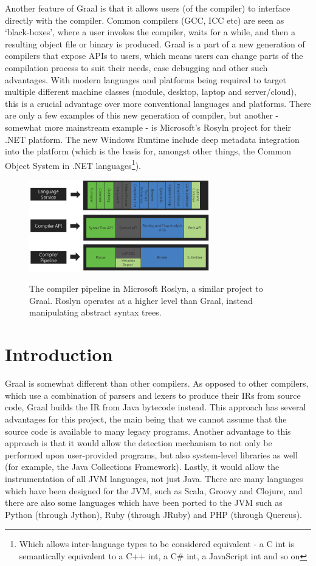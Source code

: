 Another feature of Graal is that it allows users (of the compiler) to interface directly with the compiler. Common compilers (GCC, ICC etc) are seen as `black-boxes', where a user invokes the compiler, waits for a while, and then a resulting object file or binary is produced. Graal is a part of a new generation of compilers that expose APIs to users, which means users can change parts of the compilation process to suit their needs, ease debugging and other such advantages. With modern languages and platforms being required to target multiple different machine classes (module, desktop, laptop and server/cloud), this is a crucial advantage over more conventional languages and platforms. There are only a few examples of this new generation of compiler, but another - somewhat more mainstream example - is Microsoft's Rosyln project \citep{RoslynProject} for their .NET platform. The new Windows Runtime include deep metadata integration into the platform (which is the basis for, amongst other things, the Common Object System in .NET languages\footnote{Which allows inter-language types to be considered equivalent - a C int is semantically equivalent to a C++ int, a C\# int, a JavaScript int and so on}).

\begin{figure}
	\centering
	\includegraphics[width=0.7\textwidth]{graphics/roslyn-pipeline.pdf}
	\label{fig:roslyn-pipeline}
	\caption{The compiler pipeline in Microsoft Roslyn, a similar project to Graal. Roslyn operates at a higher level than Graal, instead manipulating abstract syntax trees.}
\end{figure}

\section{Introduction} \label{sec:graal/introduction}
Graal is somewhat different than other compilers. As opposed to other compilers, which use a combination of parsers and lexers to produce their IRs from source code, Graal builds the IR from Java bytecode instead. This approach has several advantages for this project, the main being that we cannot assume that the source code is available to many legacy programs. Another advantage to this approach is that it would allow the detection mechanism to not only be performed upon user-provided programs, but also system-level libraries as well (for example, the Java Collections Framework). Lastly, it would allow the instrumentation of all JVM languages, not just Java. There are many languages which have been designed for the JVM, such as Scala, Groovy and Clojure, and there are also some languages which have been ported to the JVM such as Python (through Jython), Ruby (through JRuby) and PHP (through Quercus).

